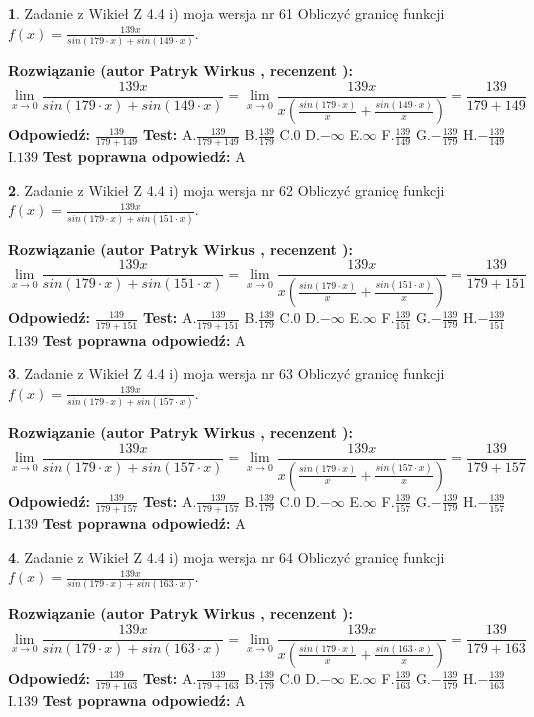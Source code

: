 \documentclass[12pt, a4paper]{article}
\theoremstyle{definition} %
\newtheorem{zad}{}
\newcommand{\zadStart}[1]{\begin{zad}#1\newline}
\newcommand{\zadStop}{\end{zad}}
\newcommand{\rozwStart}[2]{\noindent \textbf{Rozwiązanie (autor #1 , recenzent #2): }\newline}
\newcommand{\rozwStop}{\newline}
\newcommand{\odpStart}{\noindent \textbf{Odpowiedź:}\newline}
\newcommand{\odpStop}{\newline}
\newcommand{\testStart}{\noindent \textbf{Test:}\newline}
\newcommand{\testStop}{\newline}
\newcommand{\kluczStart}{\noindent \textbf{Test poprawna odpowiedź:}\newline}
\newcommand{\kluczStop}{\newline}
\begin{document}
\zadStart{Zadanie z Wikieł Z 4.4 i) moja wersja nr 61}
Obliczyć granicę funkcji $f(x)=\frac{139x}{sin(179\cdot x) +sin(149\cdot x)}$.
\zadStop
\rozwStart{Patryk Wirkus}{}
$$\lim\limits_{x\to 0}\frac{139x}{sin(179\cdot x) +sin(149\cdot x)}=\lim\limits_{x\to 0}\frac{139x}{x(\frac{sin(179\cdot x)}{x}+\frac{sin(149\cdot x)}{x})}=\frac{139}{179+149}$$
\rozwStop
\odpStart
$\frac{139}{179+149}$
\odpStop
\testStart
A.$\frac{139}{179+149}$
B.$\frac{139}{179}$
C.$0$
D.$-\infty$
E.$\infty$
F.$\frac{139}{149}$
G.$-\frac{139}{179}$
H.$-\frac{139}{149}$
I.$139$
\testStop
\kluczStart
A
\kluczStop



\zadStart{Zadanie z Wikieł Z 4.4 i) moja wersja nr 62}
Obliczyć granicę funkcji $f(x)=\frac{139x}{sin(179\cdot x) +sin(151\cdot x)}$.
\zadStop
\rozwStart{Patryk Wirkus}{}
$$\lim\limits_{x\to 0}\frac{139x}{sin(179\cdot x) +sin(151\cdot x)}=\lim\limits_{x\to 0}\frac{139x}{x(\frac{sin(179\cdot x)}{x}+\frac{sin(151\cdot x)}{x})}=\frac{139}{179+151}$$
\rozwStop
\odpStart
$\frac{139}{179+151}$
\odpStop
\testStart
A.$\frac{139}{179+151}$
B.$\frac{139}{179}$
C.$0$
D.$-\infty$
E.$\infty$
F.$\frac{139}{151}$
G.$-\frac{139}{179}$
H.$-\frac{139}{151}$
I.$139$
\testStop
\kluczStart
A
\kluczStop



\zadStart{Zadanie z Wikieł Z 4.4 i) moja wersja nr 63}
Obliczyć granicę funkcji $f(x)=\frac{139x}{sin(179\cdot x) +sin(157\cdot x)}$.
\zadStop
\rozwStart{Patryk Wirkus}{}
$$\lim\limits_{x\to 0}\frac{139x}{sin(179\cdot x) +sin(157\cdot x)}=\lim\limits_{x\to 0}\frac{139x}{x(\frac{sin(179\cdot x)}{x}+\frac{sin(157\cdot x)}{x})}=\frac{139}{179+157}$$
\rozwStop
\odpStart
$\frac{139}{179+157}$
\odpStop
\testStart
A.$\frac{139}{179+157}$
B.$\frac{139}{179}$
C.$0$
D.$-\infty$
E.$\infty$
F.$\frac{139}{157}$
G.$-\frac{139}{179}$
H.$-\frac{139}{157}$
I.$139$
\testStop
\kluczStart
A
\kluczStop



\zadStart{Zadanie z Wikieł Z 4.4 i) moja wersja nr 64}
Obliczyć granicę funkcji $f(x)=\frac{139x}{sin(179\cdot x) +sin(163\cdot x)}$.
\zadStop
\rozwStart{Patryk Wirkus}{}
$$\lim\limits_{x\to 0}\frac{139x}{sin(179\cdot x) +sin(163\cdot x)}=\lim\limits_{x\to 0}\frac{139x}{x(\frac{sin(179\cdot x)}{x}+\frac{sin(163\cdot x)}{x})}=\frac{139}{179+163}$$
\rozwStop
\odpStart
$\frac{139}{179+163}$
\odpStop
\testStart
A.$\frac{139}{179+163}$
B.$\frac{139}{179}$
C.$0$
D.$-\infty$
E.$\infty$
F.$\frac{139}{163}$
G.$-\frac{139}{179}$
H.$-\frac{139}{163}$
I.$139$
\testStop
\kluczStart
A
\kluczStop
\end{document}

